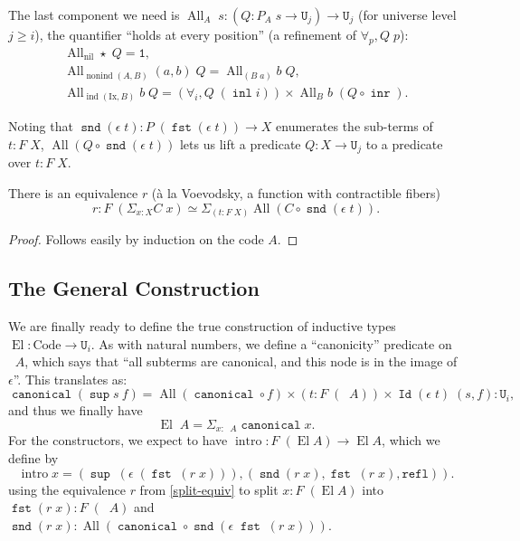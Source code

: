 \documentclass[a4paper,UKenglish,cleveref,nameinlink,autoref,thm-restate]{lipics-v2019}
\newcommand{\one}{\mathtt{1}}
\newcommand{\U}{\mathtt{U}}
\DeclareMathOperator{\supop}{\mathtt{sup}}
\renewcommand{\sup}[2]{\supop {#1}\:\!{#2}}
\DeclareMathOperator{\Idop}{\mathtt{Id}}
\newcommand{\Id}[2]{\Idop {#1}\;{#2}}
\newcommand{\refl}{\mathtt{refl}}
\DeclareMathOperator{\inl}{\mathtt{inl}}
\DeclareMathOperator{\inr}{\mathtt{inr}}
\DeclareMathOperator{\fst}{\mathtt{fst}}
\DeclareMathOperator{\snd}{\mathtt{snd}}
\DeclareMathOperator{\canonical}{\hyperref[define-canonical]{\mathtt{canonical}}}
\DeclareMathOperator{\nonind}{nonind}
\DeclareMathOperator{\ind}{ind}
\DeclareMathOperator{\nil}{nil}
\newcommand{\Code}{\mathrm{Code}}
\newcommand{\Ix}{\mathrm{Ix}}
\DeclareMathOperator{\El}{El}
\DeclareMathOperator{\preEl}{\tilde{El}}
\DeclareMathOperator{\intro}{intro}
\DeclareMathOperator{\All}{All}
\newcommand{\splitequiv}{\hyperref[split-equiv]{r}}
\begin{document}
The last component we need is $\All_A\;s : (Q : P_A\;s \to \U_j) \to \U_j$ (for universe level $j\geq i$), the quantifier ``holds at every position'' (a refinement of $\forall_p, Q\;p$):
\begin{gather}
\All_{\nil}\star\;Q = \one,\\
\All_{\nonind(A,B)}(a,b)\;Q = \All_{(B\;a)}b\;Q,\\
\All_{\ind(\Ix, B)}b\;Q = (\forall_i,Q\;(\inl i)) \times \All_{B}b\;(Q \circ \inr).
\end{gather}

Noting that $\snd (\epsilon\; t) : P\;(\fst (\epsilon\;t)) \to X$ enumerates the sub-terms of $t : F\;X$, $\All (Q \circ \snd (\epsilon\;t))$ lets us lift a predicate $Q : X \to \U_j$ to a predicate over $t : F\;X$.

\begin{lemma}\label{split-equiv}There is an equivalence $\splitequiv$ (\`a la Voevodsky, a function with contractible fibers) \begin{equation}
\splitequiv : F\;(\Sigma_{x : X}C\;x) \simeq \Sigma_{(t : F\;X)}\All (C\circ \snd (\epsilon\;t)).
\end{equation}
\end{lemma}

\begin{proof}
Follows easily by induction on the code $A$.
\end{proof}

\subsection{The General Construction}
We are finally ready to define the true construction of inductive types $\El : \Code \to \U_i$. As with natural numbers, we define a ``canonicity'' predicate on $\preEl A$, which says that ``all subterms are canonical, and this node is in the image of $\epsilon$''.
This translates as:
\begin{equation}
\canonical (\sup{s}{f}) = \All (\canonical \circ f) \times (t : F\;(\preEl A)) \times \Id{(\epsilon\; t)}{(s, f)} : \U_i,\end{equation}
and thus we finally have \begin{equation}\El\;A = \Sigma_{x : \preEl A} \canonical x.\end{equation}
For the constructors, we expect to have $\intro : F\;(\El A) \to \El A$, which we define by
\begin{equation}
\intro x = (\supop\;(\epsilon\;(\fst\;(\splitequiv\;x))),(\snd(\splitequiv\;x),\fst\;(\splitequiv\;x),\refl)).
\end{equation}
using the equivalence $\splitequiv$ from \cref{split-equiv} to split $x : F\;(\El A)$ into $\fst(\splitequiv\;x) : F\;(\preEl A)$ and $\snd(\splitequiv\;x) : \All(\canonical \circ \snd(\epsilon\;\fst\;(\splitequiv\;x)))$.
\end{document}
